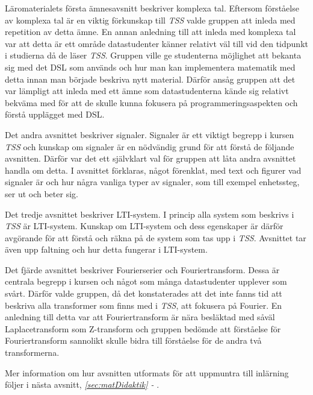 \documentclass[12pt,a4paper,twoside,openright]{article}
\begin{document}
Läromaterialets första ämnesavsnitt beskriver komplexa tal. Eftersom
förståelse av komplexa tal är en viktig förkunskap till \textit{TSS}
valde gruppen att inleda med repetition av detta ämne. En annan
anledning till att inleda med komplexa tal var att detta är ett område
datastudenter känner relativt väl till vid den tidpunkt i studierna då
de läser \textit{TSS}. Gruppen ville ge studenterna möjlighet att
bekanta sig med det DSL som används och hur man kan implementera
matematik med detta innan man började beskriva nytt material. Därför
ansåg gruppen att det var lämpligt att inleda med ett ämne som
datastudenterna kände sig relativt bekväma med för att de skulle kunna
fokusera på programmeringsaspekten och förstå upplägget med DSL.

Det andra avsnittet beskriver signaler. Signaler är ett viktigt
begrepp i kursen \textit{TSS} och kunskap om signaler är en nödvändig
grund för att förstå de följande avsnitten. Därför var det ett
självklart val för gruppen att låta andra avsnittet handla om detta. I
avsnittet förklaras, något förenklat, med text och figurer vad
signaler är och hur några vanliga typer av signaler, som till exempel
enhetssteg, ser ut och beter sig.

Det tredje avsnittet beskriver LTI-system. I princip alla system som
beskrivs i \textit{TSS} är LTI-system. Kunskap om LTI-system och dess
egenskaper är därför avgörande för att förstå och räkna på de system
som tas upp i \textit{TSS}. Avsnittet tar även upp faltning och hur
detta fungerar i LTI-system.

Det fjärde avsnittet beskriver Fourierserier och
Fouriertransform. Dessa är centrala begrepp i kursen och något som
många datastudenter upplever som svårt. Därför valde gruppen, då det
konstaterades att det inte fanns tid att beskriva alla transformer som
finns med i \textit{TSS}, att fokusera på Fourier. En anledning till
detta var att Fouriertransform är nära besläktad med såväl
Laplacetransform som Z-transform och gruppen bedömde att
förståelse för Fouriertransform sannolikt skulle bidra till
förståelse för de andra två transformerna.

Mer information om hur avsnitten utformats för att uppmuntra till
inlärning följer i nästa avsnitt, \textit{\ref{sec:matDidaktik} - }.
\end{document}
